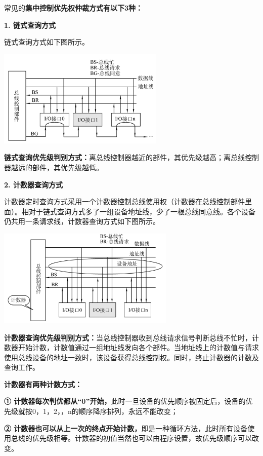 常见的\textbf{集中控制优先权仲裁方式有以下3种：}

{\textbf{1. 链式查询方式}}

链式查询方式如下图所示。

\includegraphics[width=3.12500in,height=1.83333in]{png-jpeg-pics/C709FC82AD5DDD69C9A5E4CD5A47F06F.png}

\textbf{链式查询优先级判别方式：}离总线控制器越近的部件，其优先级越高；离总线控制器越远的部件，其优先级越低。

{\textbf{2. 计数器查询方式}}

计数器定时查询方式采用一个计数器控制总线使用权（计数器在总线控制部件里面）。相对于链式查询方式多了一组设备地址线，少了一根总线同意线。各个设备仍共用一条请求线，计数器查询方式如下图所示。

\includegraphics[width=3.33333in,height=1.84375in]{png-jpeg-pics/2677CCDADE787D6529C556368B7549A1.png}

\textbf{计数器查询优先级判别方式：}当总线控制器收到总线请求信号判断总线不忙时，计数器开始计数，计数值通过一组地址线发向各个部件。当地址线上的计数值与请求使用总线设备的地址一致时，该设备获得总线控制权。同时，终止计数器的计数及查询工作。

\textbf{计数器有两种计数方式：}

\textbf{①
计数器每次判优都从``0''开始，}此时一旦设备的优先顺序被固定后，设备的优先级就按0，1，2，，n的顺序降序排列，永远不能改变；

\textbf{②
计数器也可以从上一次的终点开始计数，}即是一种循环方法，此时所有设备使用总线的优先级相等。计数器的初值当然也可以由程序设置，故优先级顺序可以改变。


